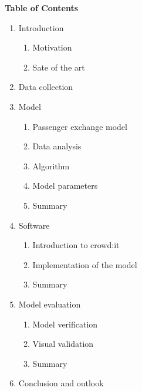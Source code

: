 \documentclass[a4paper, 12pt]{scrartcl}
\begin{document}
\newpage
\textbf{Table of Contents}
\begin{enumerate}
	\item Introduction
	\begin{enumerate} [label*=\arabic*.]
		\item Motivation
		\item Sate of the art
	\end{enumerate}
	\item Data collection
	\item Model
	\begin{enumerate} [label*=\arabic*.]
		\item Passenger exchange model
		\item Data analysis
		\item Algorithm
		\item Model parameters
		\item Summary
	\end{enumerate}
	\item Software
	\begin{enumerate} [label*=\arabic*.]
		\item Introduction to crowd:it
		\item Implementation of the model
		\item Summary
	\end{enumerate}
	\item Model evaluation
	\begin{enumerate} [label*=\arabic*.]
		\item Model verification
		\item Visual validation
		\item Summary
	\end{enumerate}
	\item Conclusion and outlook
\end{enumerate}
\end{document}
